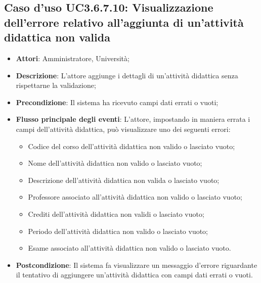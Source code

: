 \subsection{Caso d'uso \texorpdfstring{UC3.6.7.10}{UC3.6.7.10}: Visualizzazione dell'errore relativo all’aggiunta di un’attività didattica non valida}
\begin{itemize}
\item \textbf{Attori}: Amministratore, Università;
\item \textbf{Descrizione}: L'attore aggiunge i dettagli di un’attività didattica senza rispettarne la validazione;

\item \textbf{Precondizione}: Il sistema ha ricevuto campi dati errati o vuoti;

\item \textbf{Flusso principale degli eventi}: L'attore, impostando in maniera errata i campi dell’attività didattica, può visualizzare uno dei seguenti errori:
\begin{itemize}
\item Codice del corso dell’attività didattica non valido o lasciato vuoto;
\item Nome dell’attività didattica non valido o lasciato vuoto;
\item Descrizione dell’attività didattica non valida o lasciato vuoto;
\item Professore associato all’attività didattica non valido o lasciato vuoto;
\item Crediti dell’attività didattica non validi o lasciato vuoto;
\item Periodo dell’attività didattica non valido o lasciato vuoto;
\item Esame associato all’attività didattica non valido o lasciato vuoto.
\end{itemize}
\item \textbf{Postcondizione}: Il sistema fa visualizzare un messaggio d'errore riguardante il tentativo di aggiungere un'attività didattica con campi dati errati o vuoti.

\end{itemize}
